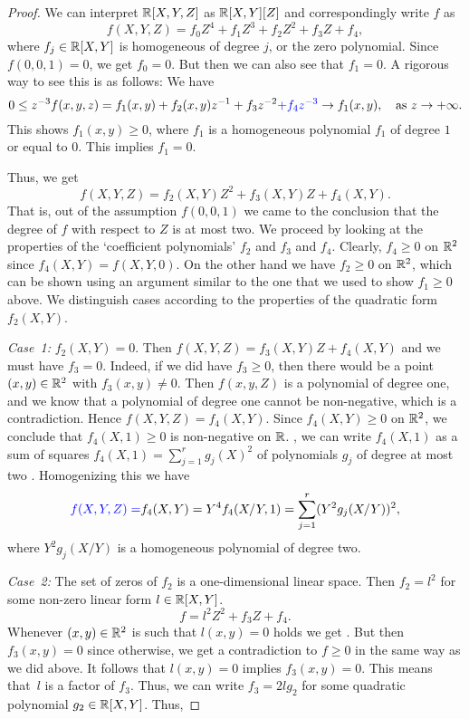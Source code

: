 \begin{proof}
	We can interpret $\mathbb{R}[X,Y,Z]$ as $\mathbb{R}[X,Y][Z]$ and correspondingly write $f$ as 
	\[
	f(X,Y,Z) = f_0 Z^4 + f_1 Z^3 + f_2 Z^2 + f_3 Z + f_4,
	\] 
	where $f_j \in \mathbb{R}[X,Y]$ is homogeneous of degree $j$, or the zero polynomial. Since $f(0,0,1)=0$, we get $f_0=0$. But then we can also see that $f_1 = 0$. A rigorous way to see this is as follows: We have 
	\[
		0 \le z^{-3} f(x,y,z) = f_1(x,y)  + f_2(x,y) z^{-1} + f_3 z^{-2} \blue{ + f_4 z^{-3}} \to f_1(x,y), \quad \text{as} \ z \to +\infty.
	\]
	This shows $f_1(x,y) \ge 0$, where $f_1$ is a homogeneous polynomial $f_1$ of degree $1$ or equal to $0$. This implies $f_1=0$. 

	Thus, we get
	\[
		f(X,Y,Z) = f_2(X,Y) Z^2 + f_3(X,Y) Z + f_4(X,Y).
	\]
	That is, out of the assumption $f(0,0,1)$ we came to the conclusion that the degree of $f$ with respect to $Z$ is at most two. We proceed by looking at the properties of the `coefficient polynomials' $f_2$ and $f_3$ and $f_4$. Clearly, $f_4 \ge 0$ on $\mathbb{R}^2$ since $f_4(X,Y)= f(X,Y,0)$. On the other hand we have $f_2 \ge 0$ on $\mathbb{R}^2$, which can be shown using an argument similar to the one that we used to show $f_1 \ge 0$ above. We distinguish cases according to the properties of the quadratic form $f_2(X,Y)$.
	
\smallskip
	\emph{Case~1:}	$f_2(X,Y)=0$. Then $f(X,Y,Z) = f_3(X,Y) Z + f_4(X,Y)$ and we must have $f_3 = 0$. Indeed, if we did have $f_3 \ge 0$, then there would be a point $(x,y) \in \mathbb{R}^2$ with $f_3(x,y) \ne 0$. Then $f(x,y,Z)$ is a polynomial of degree one, and we know that a polynomial of degree one cannot be non-negative, which is a contradiction. Hence $f(X,Y,Z) = f_4(X,Y)$. Since $f_4(X,Y) \ge 0$ on $\mathbb{R}^2$, we conclude that $f_4(X,1) \ge 0$ is non-negative on $\mathbb{R}$. , we can write $f_4(X,1)$ as a sum of squares $f_4(X,1) = \sum_{j=1}^r g_j(X)^2$ of polynomials $g_j$ of degree at most two .  Homogenizing this we have 
	\[
		\textcolor{blue}{f(X,Y,Z) = }f_4(X,Y) = Y^4 f_4(X/Y,1) = \sum_{j=1}^r (Y^2 g_j(X/Y))^2,
	\]
	where $Y^2 g_j(X/Y)$ is a homogeneous polynomial of degree two. 	

\smallskip
	\emph{Case~2:} The set of zeros of $f_2$ is a one-dimensional linear space. Then $f_2 = l^2$ for some non-zero linear form $l \in \mathbb{R}[X,Y]$. 	
	\[
		f = l^2 Z^2 + f_3 Z + f_4 .
	\]
	Whenever $(x,y) \in \mathbb{R}^2$ is such that $l(x,y)=0$ holds we get . But then $f_3(x,y)=0$ since otherwise, we get a contradiction to $f \ge 0$ in the same way as we did above. It follows that $l(x,y)=0$ implies $f_3(x,y)=0$. This means that~$l$ is a factor of $f_3$. Thus, we can write  $f_3 = 2 l g_2$ for some quadratic polynomial $g_2 \in \mathbb{R}[X,Y]$. Thus, 
	

\end{proof}
